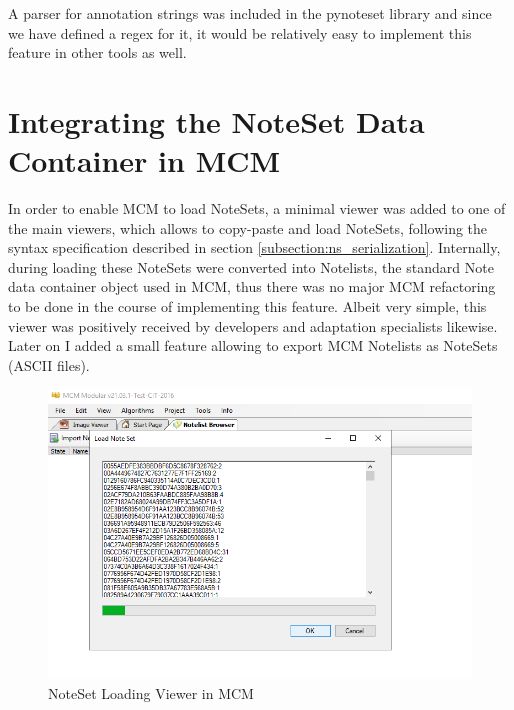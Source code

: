 A parser for annotation strings was included in the pynoteset library and since we have defined a regex for it, it would be relatively easy to implement this feature in other tools as well.

\section{Integrating the NoteSet Data Container in MCM}
In order to enable MCM to load NoteSets, a minimal viewer was added to one of the main viewers, which allows to copy-paste and load NoteSets, following the syntax specification described in section \ref{subsection:ns_serialization}. Internally, during loading these NoteSets were converted into Notelists, the standard Note data container object used in MCM, thus there was no major MCM refactoring to be done in the course of implementing this feature. Albeit very simple, this viewer was positively received by developers and adaptation specialists likewise. Later on I added a small feature allowing to export MCM Notelists as NoteSets (ASCII files).
\begin{figure}
 \includegraphics[width=\linewidth]{images/mcm_ns_Loader.png}
   \caption{NoteSet Loading Viewer in MCM}\label{fig:ns_loader}
\end{figure}